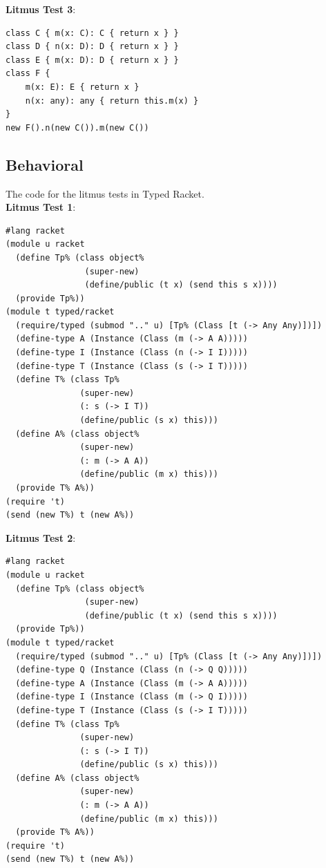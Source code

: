 \documentclass[a4paper,USenglish]{tex/lipics-v2016}
\begin{document}
\noindent\textbf{Litmus Test 3}:
\begin{verbatim}
class C { m(x: C): C { return x } }
class D { n(x: D): D { return x } }
class E { m(x: D): D { return x } }
class F {
    m(x: E): E { return x }
    n(x: any): any { return this.m(x) }
}
new F().n(new C()).m(new C())
\end{verbatim}

\subsection*{Behavioral}

The code for the litmus tests in Typed Racket. \\

\noindent\textbf{Litmus Test 1}:

\begin{verbatim}
#lang racket
(module u racket
  (define Tp% (class object%
                (super-new)
                (define/public (t x) (send this s x))))
  (provide Tp%))
(module t typed/racket
  (require/typed (submod ".." u) [Tp% (Class [t (-> Any Any)])])
  (define-type A (Instance (Class (m (-> A A)))))
  (define-type I (Instance (Class (n (-> I I)))))
  (define-type T (Instance (Class (s (-> I T)))))
  (define T% (class Tp%
               (super-new)
               (: s (-> I T))
               (define/public (s x) this)))
  (define A% (class object%
               (super-new)
               (: m (-> A A))
               (define/public (m x) this)))
  (provide T% A%))
(require 't)
(send (new T%) t (new A%))
\end{verbatim}

\noindent\textbf{Litmus Test 2}:

\begin{verbatim}
#lang racket
(module u racket
  (define Tp% (class object%
                (super-new)
                (define/public (t x) (send this s x))))
  (provide Tp%))
(module t typed/racket
  (require/typed (submod ".." u) [Tp% (Class [t (-> Any Any)])])
  (define-type Q (Instance (Class (n (-> Q Q)))))
  (define-type A (Instance (Class (m (-> A A)))))
  (define-type I (Instance (Class (m (-> Q I)))))
  (define-type T (Instance (Class (s (-> I T)))))
  (define T% (class Tp%
               (super-new)
               (: s (-> I T))
               (define/public (s x) this)))
  (define A% (class object%
               (super-new)
               (: m (-> A A))
               (define/public (m x) this)))
  (provide T% A%))
(require 't)
(send (new T%) t (new A%))
\end{verbatim}
\end{document}
